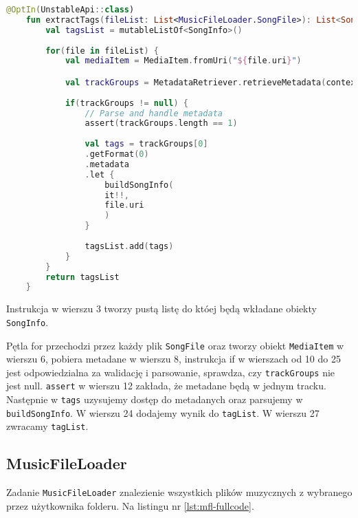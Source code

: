 \begin{lstlisting}[caption=Metoda \texttt{TagExtractor()}, label={lst:Tag-tagextractor}, language=kotlin]
	@OptIn(UnstableApi::class)
	fun extractTags(fileList: List<MusicFileLoader.SongFile>): List<SongInfo> {
		val tagsList = mutableListOf<SongInfo>()
		
		for(file in fileList) {
			val mediaItem = MediaItem.fromUri("${file.uri}")

			val trackGroups = MetadataRetriever.retrieveMetadata(context, mediaItem).get()
			
			if(trackGroups != null) {
				// Parse and handle metadata
				assert(trackGroups.length == 1)
				
				val tags = trackGroups[0]
				.getFormat(0)
				.metadata
				.let {
					buildSongInfo(
					it!!,
					file.uri
					)
				}
				
				tagsList.add(tags)
			}
		}
		return tagsList
	}
\end{lstlisting}
Instrukcja w wierszu 3 tworzy pustą listę do któej będą wkładane obiekty \texttt{SongInfo}.

Pętla for przechodzi przez każdy plik \texttt{SongFile} oraz tworzy obiekt \texttt{MediaItem} w wierszu 6, pobiera metadane w wierszu 8, instrukcja if w wierszach od 10 do 25 jest odpowiedzialna za walidację i parsowanie, sprawdza, czy \texttt{trackGroups} nie jest null. \texttt{assert} w wierszu 12 zakłada, że metadane będą w jednym tracku. Następnie w \texttt{tags} uzysujemy dostęp do metadanych oraz parsujemy w \texttt{buildSongInfo}.
W wierszu 24 dodajemy wynik do \texttt{tagList}.
W wierszu 27 zwracamy \texttt{tagList}.

\subsection{MusicFileLoader}
Zadanie \texttt{MusicFileLoader} znalezienie wszystkich plików muzycznych z wybranego przez użytkownika folderu.
Na listingu nr \ref{lst:mfl-fullcode}.

